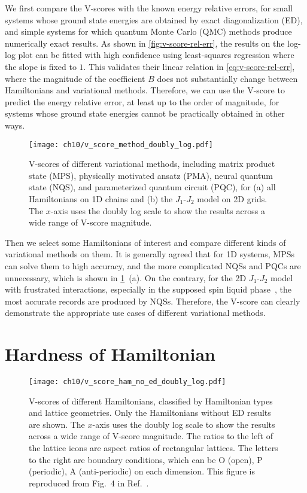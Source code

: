 We first compare the V-scores with the known energy relative errors, for small systems whose ground state energies are obtained by exact diagonalization (ED), and simple systems for which quantum Monte Carlo (QMC) methods produce numerically exact results. As shown in \cref{fig:v-score-rel-err}, the results on the log-log plot can be fitted with high confidence using least-squares regression where the slope is fixed to $1$. This validates their linear relation in \cref{eq:v-score-rel-err}, where the magnitude of the coefficient $B$ does not substantially change between Hamiltonians and variational methods. Therefore, we can use the V-score to predict the energy relative error, at least up to the order of magnitude, for systems whose ground state energies cannot be practically obtained in other ways.

\begin{figure}[htb]
\centering
\texttt{[image: ch10/v\_score\_method\_doubly\_log.pdf]}
\caption[V-scores of different variational methods]{
V-scores of different variational methods, including matrix product state (MPS), physically motivated ansatz (PMA), neural quantum state (NQS), and parameterized quantum circuit (PQC), for (a) all Hamiltonians on 1D chains and (b) the $J_1$-$J_2$ model on 2D grids.
The $x$-axis uses the doubly log scale to show the results across a wide range of V-score magnitude.
}
\label{fig:v-score-method}
\end{figure}

Then we select some Hamiltonians of interest and compare different kinds of variational methods on them. It is generally agreed that for 1D systems, MPSs can solve them to high accuracy, and the more complicated NQSs and PQCs are unnecessary, which is shown in \cref{fig:v-score-method}~(a). On the contrary, for the 2D $J_1$-$J_2$ model with frustrated interactions, especially in the supposed spin liquid phase~\cite{dagotto1989phase, schulz1996magnetic, hu2013direct, liang2018solving, liu2018gapless, choo2019two, nomura2021dirac}, the most accurate records are produced by NQSs. Therefore, the V-score can clearly demonstrate the appropriate use cases of different variational methods.

\section{Hardness of Hamiltonian}

\begin{figure}[htb]
\centering
\texttt{[image: ch10/v\_score\_ham\_no\_ed\_doubly\_log.pdf]}
\caption[V-scores of different Hamiltonians]{
V-scores of different Hamiltonians, classified by Hamiltonian types and lattice geometries.
Only the Hamiltonians without ED results are shown.
The $x$-axis uses the doubly log scale to show the results across a wide range of V-score magnitude.
The ratios to the left of the lattice icons are aspect ratios of rectangular lattices. The letters to the right are boundary conditions, which can be O (open), P (periodic), A (anti-periodic) on each dimension.
This figure is reproduced from Fig.~4 in Ref.~\cite{wu2023variational}.
}
\label{fig:v-score-ham}
\end{figure}


